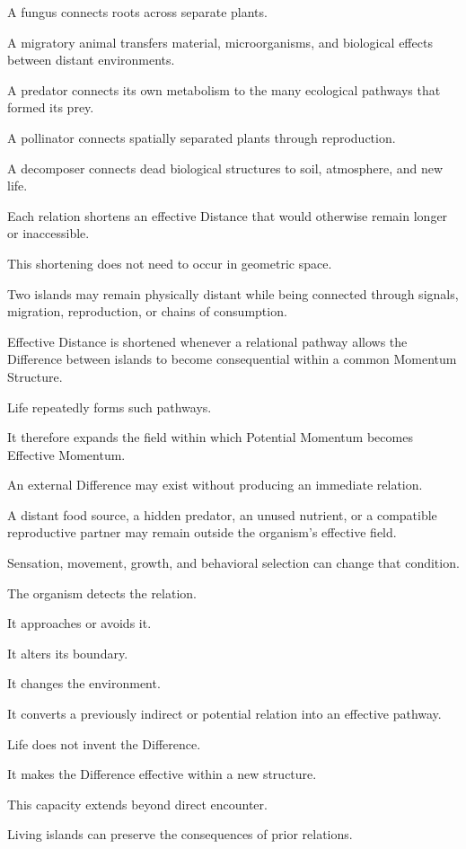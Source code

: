 A fungus connects roots across separate plants.

A migratory animal transfers material, microorganisms, and biological effects between distant environments.

A predator connects its own metabolism to the many ecological pathways that formed its prey.

A pollinator connects spatially separated plants through reproduction.

A decomposer connects dead biological structures to soil, atmosphere, and new life.

Each relation shortens an effective Distance that would otherwise remain longer or inaccessible.

This shortening does not need to occur in geometric space.

Two islands may remain physically distant while being connected through signals, migration, reproduction, or chains of consumption.

Effective Distance is shortened whenever a relational pathway allows the Difference between islands to become consequential within a common Momentum Structure.

Life repeatedly forms such pathways.

It therefore expands the field within which Potential Momentum becomes Effective Momentum.

An external Difference may exist without producing an immediate relation.

A distant food source, a hidden predator, an unused nutrient, or a compatible reproductive partner may remain outside the organism’s effective field.

Sensation, movement, growth, and behavioral selection can change that condition.

The organism detects the relation.

It approaches or avoids it.

It alters its boundary.

It changes the environment.

It converts a previously indirect or potential relation into an effective pathway.

Life does not invent the Difference.

It makes the Difference effective within a new structure.

This capacity extends beyond direct encounter.

Living islands can preserve the consequences of prior relations.

